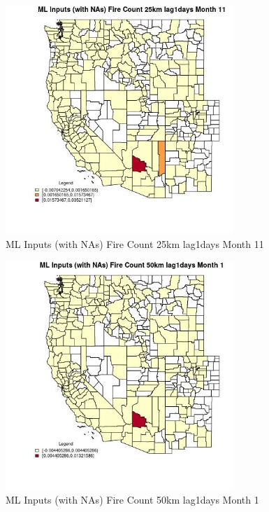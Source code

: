 \begin{figure} 
\centering  
\includegraphics[width=0.77\textwidth]{Code_Outputs/Report_ML_input_PM25_Step4_part_e_de_duplicated_aves_compiled_2019-05-21wNAs_CountyFire_Count_25km_lag1daysmedianMonth11.jpg} 
\caption{\label{fig:Report_ML_input_PM25_Step4_part_e_de_duplicated_aves_compiled_2019-05-21wNAsCountyFire_Count_25km_lag1daysmedianMonth11}ML Inputs (with NAs) Fire Count 25km lag1days Month 11} 
\end{figure} 
 

\clearpage 

\begin{figure} 
\centering  
\includegraphics[width=0.77\textwidth]{Code_Outputs/Report_ML_input_PM25_Step4_part_e_de_duplicated_aves_compiled_2019-05-21wNAs_CountyFire_Count_50km_lag1daysmedianMonth1.jpg} 
\caption{\label{fig:Report_ML_input_PM25_Step4_part_e_de_duplicated_aves_compiled_2019-05-21wNAsCountyFire_Count_50km_lag1daysmedianMonth1}ML Inputs (with NAs) Fire Count 50km lag1days Month 1} 
\end{figure} 
 


